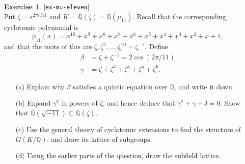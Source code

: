 \documentclass{amsart}
\newcommand{\Q}         {{\mathbb{Q}}}
\newcommand{\bt}        {\beta}
\newcommand{\gm}        {\gamma}
\newcommand{\zt}        {\zeta}
\newcommand{\vph}       {\varphi}
\renewcommand{\:}{\colon}
\newcommand{\lastexlabel}{}
\newcommand{\exlabel}[1]{
 \global\def\lastexlabel{#1}\label{#1}[\texttt{#1}]\ \\
}
\newcommand{\exlabel}[1]{
 \global\def\lastexlabel{#1}\label{#1}
}
\theoremstyle{definition}
\newtheorem{exercise}{Exercise}[section]
\begin{document}
\begin{exercise}\exlabel{ex-mu-eleven}
 Put $\zt=e^{{2\pi i}/{11}}$ and $K=\Q(\zt)=\Q(\mu_{11})$.  Recall
 that the corresponding cyclotomic polynomial is 
 \[ \vph_{11}(x) = x^{10}+x^9+x^8+x^7+x^6+x^5+x^4+x^3+x^2+x+1, \]
 and that the roots of this are $\zt,\zt^2,\dotsc,\zt^{10}=\zt^{-1}$.  
 Define
 \begin{align*}
  \bt &= \zt+\zt^{-1} = 2\cos(2\pi/11) \\
  \gm &= \zt+\zt^3+\zt^4+\zt^5+\zt^9.
 \end{align*}
 \begin{itemize}
  \item[(a)] Explain why $\bt$ satisfies a quintic equation over $\Q$,
   and write it down.
  \item[(b)] Expand $\gm^2$ in powers of $\zt$, and hence deduce 
   that $\gm^2+\gm+3=0$. Show that $\Q(\sqrt{-11})\subseteq\Q(\zt)$.
  \item[(c)] Use the general theory of cyclotomic extensions to find
   the structure of $G(K/\Q)$, and draw its lattice of subgroups.
  \item[(d)] Using the earlier parts of the question, draw the
   subfield lattice. 
 \end{itemize}
\end{exercise}
\end{document}
